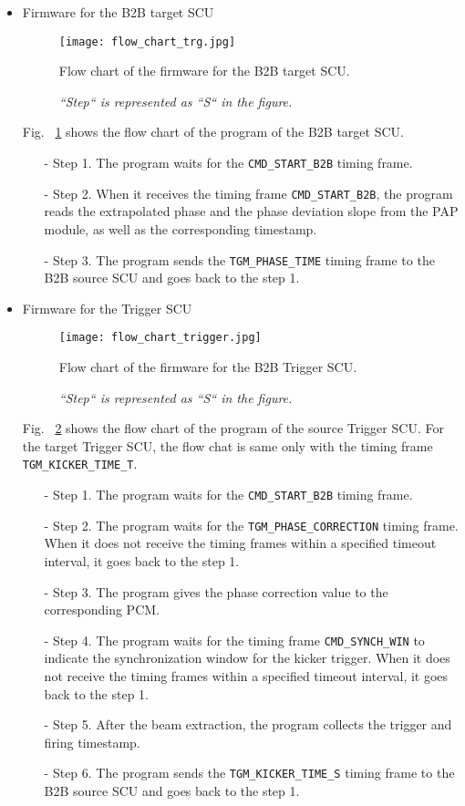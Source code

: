 \begin{itemize}
\begin{itemize}
	\end{itemize}
\item Firmware for the B2B target SCU
\begin{figure}[H]
   \centering   
   \texttt{[image: flow\_chart\_trg.jpg]}
   \caption{Flow chart of the firmware for the B2B target SCU.}
	\caption*{\textsl{\small{``Step`` is represented as ``S`` in the figure. }}}
   \label{flow_chart_trg}
\end{figure}
Fig. ~\ref{flow_chart_trg} shows the flow chart of the program of the B2B target SCU.
 	\begin{itemize}
		\item[-]Step 1. The program waits for the \verb|CMD_START_B2B| timing frame.
 		\item[-]Step 2. When it receives the timing frame \verb|CMD_START_B2B|, the program reads the extrapolated phase and the phase deviation slope from the PAP module, as well as the corresponding timestamp.
		\item[-]Step 3. The program sends the \verb|TGM_PHASE_TIME| timing frame to the B2B source SCU and goes back to the step 1.
	\end{itemize}
\item Firmware for the Trigger SCU
\begin{figure}[H]
   \centering   
   \texttt{[image: flow\_chart\_trigger.jpg]}
   \caption{Flow chart of the firmware for the B2B Trigger SCU.}
	\caption*{\textsl{\small{``Step`` is represented as ``S`` in the figure.}}}
   \label{flow_chart_trigger}
\end{figure}
Fig. ~\ref{flow_chart_trigger} shows the flow chart of the program of the source Trigger SCU. For the target Trigger SCU, the flow chat is same only with the timing frame \verb|TGM_KICKER_TIME_T|.
 	\begin{itemize}
		\item[-]Step 1. The program waits for the \verb|CMD_START_B2B| timing frame. 
		\item[-]Step 2. The program waits for the \verb|TGM_PHASE_CORRECTION| timing frame. When it does not receive the timing frames within a specified timeout interval, it goes back to the step 1.
		\item[-]Step 3. The program gives the phase correction value to the corresponding PCM.
 		\item[-]Step 4. The program waits for the timing frame \verb|CMD_SYNCH_WIN| to indicate the synchronization window for the kicker trigger. When it does not receive the timing frames within a specified timeout interval, it goes back to the step 1.
		\item[-]Step 5. After the beam extraction, the program collects the trigger and firing timestamp. 
		\item[-]Step 6. The program sends the \verb|TGM_KICKER_TIME_S| timing frame to the B2B source SCU and goes back to the step 1.
	\end{itemize}

\end{itemize}
